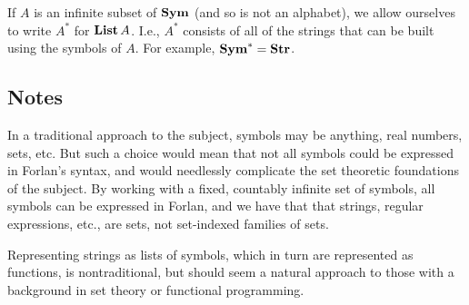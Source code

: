 If $A$ is an infinite subset of $\mathbf{Sym}$ (and so is not an alphabet), we
allow ourselves to write $A^*$
%
for $\mathbf{List}\,A$.
I.e., $A^*$ consists of all of the strings that can be built using the
symbols of $A$.  For example, $\mathbf{Sym}^* = \mathbf{Str}$.
%
%
%

\subsection{Notes}

In a traditional approach to the subject, symbols may be anything,
real numbers, sets, etc.  But such a choice would mean that not all
symbols could be expressed in Forlan's syntax, and would needlessly
complicate the set theoretic foundations of the subject.  By working
with a fixed, countably infinite set of symbols, all symbols can be
expressed in Forlan, and we have that that strings, regular
expressions, etc., are sets, not set-indexed families of sets.

Representing strings as lists of symbols, which in turn are
represented as functions, is nontraditional, but should seem a natural
approach to those with a background in set theory or functional
programming.

